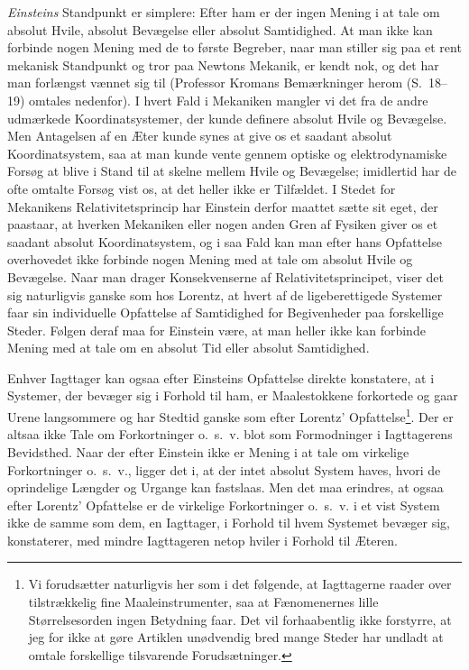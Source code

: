 \documentclass[12pt,a4paper]{article}
\newcommand{\opage}[1]{\marginnote{\footnotesize\textit{[#1]}}}
\begin{document}
\emph{Einsteins} Standpunkt er simplere: Efter ham er der ingen Mening
i at tale om absolut Hvile, absolut Bevægelse eller absolut
\opage{22} %
\setcounter{footnote}{0}%
Samtidighed. At man ikke kan forbinde nogen Mening med de to første
Begreber, naar man stiller sig paa et rent mekanisk Standpunkt og tror
paa Newtons Mekanik, er kendt nok, og det har man forlængst vænnet sig
til (Professor Kromans Bemærkninger herom (S.~18--19) omtales
nedenfor). I hvert Fald i Mekaniken mangler vi det fra de andre
udmærkede Koordinatsystemer, der kunde definere absolut Hvile og
Bevægelse. Men Antagelsen af en Æter kunde synes at give os et saadant
absolut Koordinatsystem, saa at man kunde vente gennem optiske og
elektrodynamiske Forsøg at blive i Stand til at skelne mellem Hvile og
Bevægelse; imidlertid har de ofte omtalte Forsøg vist os, at det heller
ikke er Tilfældet. I Stedet for Mekanikens Relativitetsprincip har
Einstein derfor maattet sætte sit eget, der paastaar, at hverken
Mekaniken eller nogen anden Gren af Fysiken giver os et saadant absolut
Koordinatsystem, og i saa Fald kan man efter hans Opfattelse
overhovedet ikke forbinde nogen Mening med at tale om absolut Hvile og
Bevægelse. Naar man drager Konsekvenserne af Relativitetsprincipet,
viser det sig naturligvis ganske som hos Lorentz, at hvert af de
ligeberettigede Systemer faar sin individuelle Opfattelse af
Samtidighed for Begivenheder paa forskellige Steder. Følgen deraf maa
for Einstein være, at man heller ikke kan forbinde Mening med at tale
om en absolut Tid eller absolut Samtidighed.

Enhver Iagttager kan ogsaa efter Einsteins Opfattelse direkte
konstatere, at i Systemer, der bevæger sig i Forhold til ham, er
Maalestokkene forkortede og gaar Urene langsommere og har Stedtid
ganske som efter Lorentz' Opfattelse\footnote{Vi forudsætter
naturligvis her som i det følgende, at Iagttagerne raader over
tilstrækkelig fine Maaleinstrumenter, saa at Fænomenernes lille
Størrelsesorden ingen Betydning faar. Det vil forhaabentlig ikke
forstyrre, at jeg for ikke at gøre Artiklen unødvendig bred mange
Steder har undladt at omtale forskellige tilsvarende
Forudsætninger.}. Der er altsaa ikke Tale om Forkortninger o.~s.~v.
blot som Formodninger i Iagttagerens Bevidsthed. Naar der efter
Einstein ikke er Mening i at tale om virkelige Forkortninger o.~s.~v.,
ligger det i, at der intet absolut System haves, hvori de
\guillemotright oprindelige\guillemotleft{} Længder og Urgange kan
fastslaas. Men det maa erindres, at ogsaa efter Lorentz' Opfattelse er
de virkelige Forkortninger o.~s.~v. i et vist System ikke de samme som
dem, en Iagttager, i Forhold til hvem Systemet bevæger sig,
\opage{23} %
\setcounter{footnote}{0}%
konstaterer, med mindre Iagttageren netop hviler i Forhold til Æteren.
\end{document}
